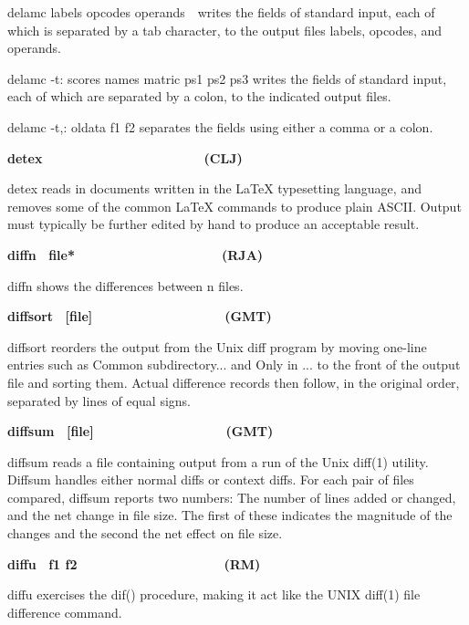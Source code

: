 {\textsf{delamc labels opcodes operands}\ \ writes the fields of standard
input, each of which is separated by a tab character, to the output
files \textsf{labels}, \textsf{opcodes}, and \textsf{operands}.

\textsf{delamc -t: scores names matric ps1 ps2 ps3} writes the fields of
standard input, each of which are separated by a colon, to the
indicated output files.

\textsf{delamc -t,: oldata f1 f2} separates the fields using either a
comma or a colon.

{\sffamily\bfseries
detex\ \ \ \ \ \ \ \ \ \ \ \ \ \ \ \ \ \ \ \ \ \ (CLJ)}

\textsf{detex} reads in documents written in the LaTeX
typesetting language, and removes some of the common LaTeX commands to
produce plain ASCII. Output must typically be further
edited by hand to produce an acceptable result.

{\sffamily\bfseries
diffn
\ \textrm{\textmd{file*\ \ \ \ \ \ \ \ \ \ \ \ \ \ \ \ \ \ \ \ }}(RJA)}

\textsf{diffn} shows the differences between n files.

{\sffamily\bfseries
diffsort
\ \textrm{\textmd{[file]\ \ \ \ \ \ \ \ \ \ \ \ \ \ \ \ \ \ }}(GMT)}

\textsf{diffsort} reorders the output from the Unix
{\textquotedbl}diff{\textquotedbl} program by moving one-line entries
such as {\textquotedbl}Common subdirectory...{\textquotedbl} and
{\textquotedbl}Only in ...{\textquotedbl} to the front of the output
file and sorting them. Actual difference records then follow, in the
original order, separated by lines of equal signs. 

{\sffamily\bfseries
diffsum
\ \textrm{\textmd{[file]\ \ \ \ \ \ \ \ \ \ \ \ \ \ \ \ \ \ }}(GMT)}

\textsf{diffsum} reads a file containing output from a run of the Unix
\textsf{diff(1)} utility. Diffsum handles either normal diffs or
context diffs. For each pair of files compared, diffsum reports two
numbers: The number of lines added or changed, and the net change in
file size. The first of these indicates the magnitude of the changes
and the second the net effect on file size. 

{\sffamily\bfseries
diffu \ \textrm{\textmd{f1 f2\ \ \ \ \ \ \ \ \ \ \ \ \ \ \ \ \ \ \ \ 
}}(RM)}

\textsf{diffu} exercises the \textsf{dif()} procedure, making it act
like the UNIX \textsf{diff(1)} file difference command.

}
